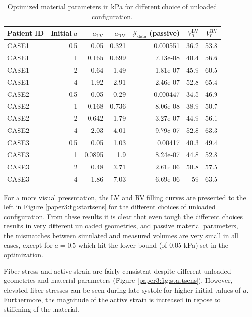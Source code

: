 \begin{table}
  \centering
\caption{Optimized material parameters in kPa for different choice of
  unloaded configuration.}
\begin{tabular}{lrrrrrr}
\hline
  Patient ID   &   Initial $a$ &   $a_{\mathrm{LV}}$ &   $a_{\mathrm{RV}}$
  &   $\mathcal{J}_{\mathrm{data}}$ (passive) &   $V_0^{\mathrm{LV}}$ &   $V_0^{\mathrm{RV}}$ \\

\hline
 CASE1 & 0.5 & 0.05   & 0.321 & 0.000551 & 36.2 & 53.8 \\
 CASE1 & 1   & 0.165  & 0.699 & 7.13e-08 & 40.4 & 56.6 \\
 CASE1 & 2   & 0.64   & 1.49  & 1.81e-07 & 45.9 & 60.5 \\
 CASE1 & 4   & 1.92   & 2.91  & 2.46e-07 & 52.8 & 65.4 \\
 CASE2 & 0.5 & 0.05   & 0.29  & 0.000447 & 34.5 & 46.9 \\
 CASE2 & 1   & 0.168  & 0.736 & 8.06e-08 & 38.9 & 50.7 \\
 CASE2 & 2   & 0.642  & 1.79  & 3.27e-07 & 44.9 & 56.1 \\
 CASE2 & 4   & 2.03   & 4.01  & 9.79e-07 & 52.8 & 63.3 \\
 CASE3 & 0.5 & 0.05   & 1.03  & 0.00417  & 40.3 & 49.4 \\
 CASE3 & 1   & 0.0895 & 1.9   & 8.24e-07 & 44.8 & 52.8 \\
 CASE3 & 2   & 0.48   & 3.71  & 2.61e-06 & 50.8 & 57.5 \\
 CASE3 & 4   & 1.86   & 7.03  & 6.69e-06 & 59   & 63.5 \\
\hline
\end{tabular}
\label{paper3:tab:optmal_material_params_start}
\end{table}

For a more visual presentation, the LV and RV filling curves are
presented to the left in Figure \ref{paper3:fig:startsens} for the different choices of unloaded
configuration. From these results it is clear that even tough the
different choices results in very different unloaded geometries, and
passive material parameters, the mismatches between simulated
and measured volumes are very small in all cases, except for $a=0.5$
which hit the lower bound (of $0.05$ kPa) set in the optimization. 

Fiber stress and active strain are fairly consistent despite different
unloaded geometries and material parameters (Figure \ref{paper3:fig:startsens}). 
However, elevated fiber stresses can be seen during late systole for
higher initial values of $a$. Furthermore, the magnitude of the active
strain is increased in repose to stiffening of the material.


